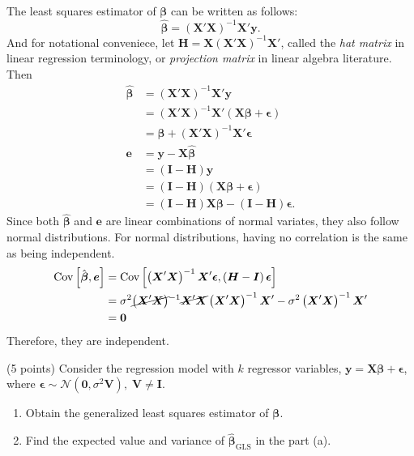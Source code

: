 \documentclass[answers]{exam}
\newcommand{\bs}{\boldsymbol}
\newcommand{\opn}{\operatorname}
\begin{document}
\begin{questions}
\begin{solution}
   \end{solution}
   \begin{solution}
   The least squares estimator of $\bs{\beta}$ can be written as follows:
   $$
      \hat{\bs{\beta}} = \left(\bs{X}'\bs{X}\right)^{-1}\bs{X}'\bs{y}.
   $$
   And for notational conveniece, let $\bs{H}=\bs{X}\left(\bs{X}'\bs{X}\right)^{-1}\bs{X}'$, called the \emph{hat matrix} in linear regression terminology, or \emph{projection matrix} in linear algebra literature. Then
   \begin{align*}
      \hat{\bs{\beta}} &= \left(\bs{X}'\bs{X}\right)^{-1}\bs{X}'\bs{y}\\
      &= \left(\bs{X}'\bs{X}\right)^{-1}\bs{X}'\left(\bs{X\beta}+\bs{\epsilon}\right)\\
      &= \bs{\beta} + \left(\bs{X}'\bs{X}\right)^{-1}\bs{X}'\bs{\epsilon}\\
      \bs{e} &= \bs{y} -\bs{X}\hat{\bs{\beta}}\\
      &= \left(\bs{I} -\bs{H}\right)\bs{y}\\
      &= \left(\bs{I}-\bs{H}\right)\left(\bs{X\beta}+\bs{\epsilon}\right)\\
      &= \left(\bs{I}-\bs{H}\right)\bs{X\beta} -\left(\bs{I}-\bs{H}\right)\bs{\epsilon}.
   \end{align*}
   Since both $\hat{\bs{\beta}}$ and $\bs{e}$ are linear combinations of normal variates, they also follow normal distributions. For normal distributions, having no correlation is the same as being independent.
   \begin{align*}
      \opn{Cov}\left[\hat{\bs{\beta}}, \bs{e}\right] &= \opn{Cov}\left[\left(\bs{X}'\bs{X}\right)^{-1}\bs{X}'\bs{\epsilon}, \left(\bs{H}-\bs{I}\right)\bs{\epsilon} \right]\\
      &= \sigma^{2}\cancel{\left(\bs{X}'\bs{X} \right)}^{-1}\cancel{\bs{X}'\bs{X}}\left(\bs{X}'\bs{X} \right)^{-1}\bs{X}' - \sigma^{2}\left(\bs{X}'\bs{X}\right)^{-1}\bs{X}'\\
      &= \bs{0}
   \end{align*}
   Therefore, they are independent.
   \end{solution}
   \question
   (5 points) Consider the regression model with $k$ regressor variables, $\bs{y}=\bs{X\beta} + \bs{\epsilon}$, where $\bs{\epsilon} \sim \mathcal{N}\left(\bs{0},\sigma^{2}\bs{V}\right), \; \bs{V}\neq \bs{I}$.
   \begin{enumerate}[label=(\alph*)]
      \item Obtain the generalized least squares estimator of $\bs{\beta}$.
      \item Find the expected value and variance of $\hat{\bs{\beta}}_{\text{GLS}}$ in the part (a).
   \end{enumerate}
   \begin{solution}


\end{solution}
\end{questions}
\end{document}
